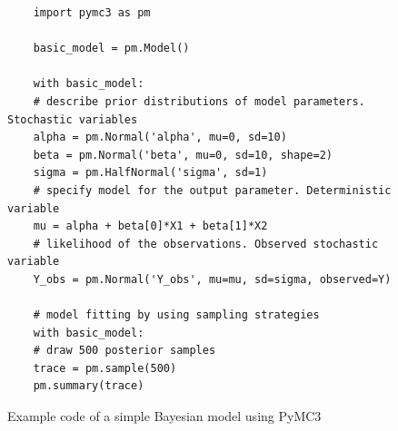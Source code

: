 \documentclass{article}
\begin{document}
\begin{figure}
	\begin{lstlisting}
	import pymc3 as pm
	
	basic_model = pm.Model()
	
	with basic_model:
	# describe prior distributions of model parameters. Stochastic variables
	alpha = pm.Normal('alpha', mu=0, sd=10)
	beta = pm.Normal('beta', mu=0, sd=10, shape=2)
	sigma = pm.HalfNormal('sigma', sd=1)
	# specify model for the output parameter. Deterministic variable
	mu = alpha + beta[0]*X1 + beta[1]*X2
	# likelihood of the observations. Observed stochastic variable
	Y_obs = pm.Normal('Y_obs', mu=mu, sd=sigma, observed=Y)
	
	# model fitting by using sampling strategies   
	with basic_model:
	# draw 500 posterior samples
	trace = pm.sample(500)
	pm.summary(trace)
	\end{lstlisting}
	\caption[Example code of a simple Bayesian model using PyMC3]{Example code of a simple Bayesian model using PyMC3}
	\label{fig:pymc3_example_code}
\end{figure}






\end{document}
